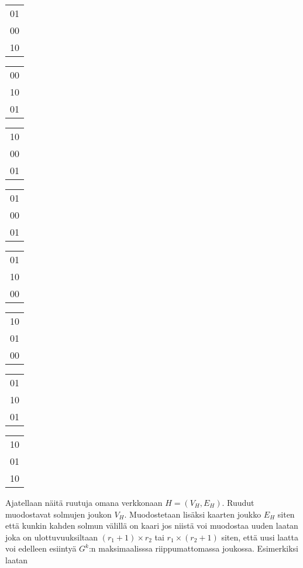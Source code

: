\documentclass[12pt,finnish]{tktltiki2}
\theoremstyle{definition}
\theoremstyle{remark}
\begin{document}
\begin{center}
\begin{tabular}{ | c | }
  \hline
  01 \\
  00 \\
  10 \\
  \hline
\end{tabular}
\begin{tabular}{ | c | }
  \hline
  00 \\
  10 \\
  01 \\
  \hline
\end{tabular}
\begin{tabular}{ | c | }
  \hline
  10 \\
  00 \\
  01 \\
  \hline
\end{tabular}
\begin{tabular}{ | c | }
  \hline
  01 \\
  00 \\
  01 \\
  \hline
\end{tabular}
\begin{tabular}{ | c | }
  \hline
  01 \\
  10 \\
  00 \\
  \hline
\end{tabular}
\begin{tabular}{ | c | }
  \hline
  10 \\
  01 \\
  00 \\
  \hline
\end{tabular}
\begin{tabular}{ | c | }
  \hline
  01 \\
  10 \\
  01 \\
  \hline
\end{tabular}
\begin{tabular}{ | c | }
  \hline
  10 \\
  01 \\
  10 \\
  \hline
\end{tabular}
\end{center}
Ajatellaan näitä ruutuja omana verkkonaan $H = (V_H, E_H)$. Ruudut muodostavat solmujen joukon $V_H$. Muodostetaan lisäksi kaarten joukko $E_H$ siten että kunkin kahden solmun välillä on kaari jos niistä voi muodostaa uuden laatan joka on ulottuvuuksiltaan $(r_1 + 1) \times r_2$ tai $r_1 \times (r_2 + 1)$ siten, että uusi laatta voi edelleen esiintyä $G^k$:n maksimaalisssa riippumattomassa joukossa. Esimerkiksi laatan
\end{document}
